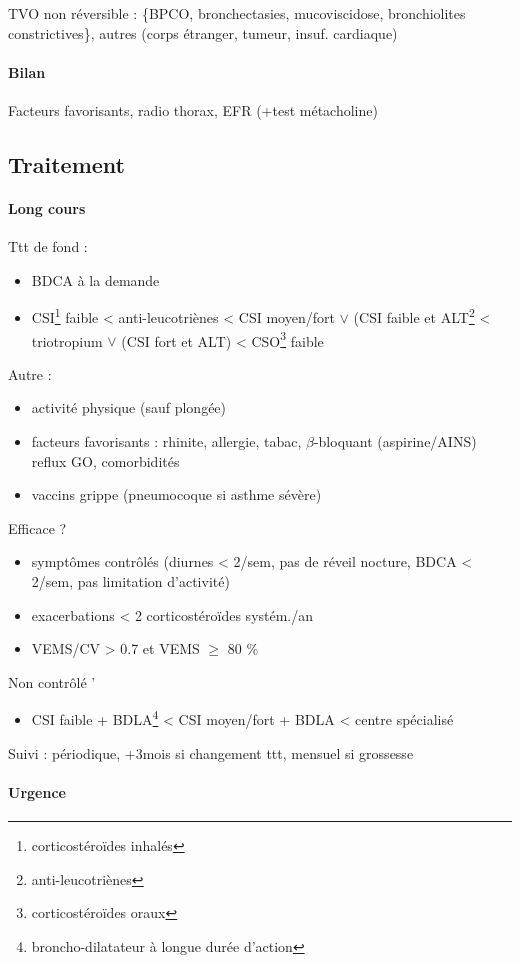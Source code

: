 \documentclass{article}
\begin{document}
TVO non réversible : \{BPCO, bronchectasies, mucoviscidose, bronchiolites
constrictives\}, autres (corps étranger, tumeur, insuf. cardiaque)
\paragraph{Bilan}
Facteurs favorisants, radio thorax, EFR (+test métacholine)

\subsection{Traitement}

\paragraph{Long cours}
Ttt de fond :
\begin{itemize}
\item BDCA à la demande
\item CSI\footnote{corticostéroïdes inhalés} faible < anti-leucotriènes < CSI moyen/fort
\(\vee\) (CSI faible et ALT\footnote{anti-leucotriènes} < triotropium \(\vee\) (CSI fort et
ALT) < CSO\footnote{corticostéroïdes oraux} faible
\end{itemize}
Autre : 
\begin{itemize}
\item activité physique (sauf plongée)
\item facteurs favorisants : rhinite, allergie, tabac, \(\beta\)-bloquant
(aspirine/AINS) reflux GO, comorbidités
\item vaccins grippe (pneumocoque si asthme sévère)
\end{itemize}
Efficace ?
\begin{itemize}
\item symptômes contrôlés (diurnes < 2/sem, pas de réveil nocture, BDCA < 2/sem, pas
limitation d'activité)
\item exacerbations < 2 corticostéroïdes systém./an
\item VEMS/CV > 0.7 et VEMS \(\ge\) 80 \%
\end{itemize}
Non contrôlé '
\begin{itemize}
\item CSI faible + BDLA\footnote{broncho-dilatateur à longue durée d'action} < CSI
moyen/fort + BDLA < centre spécialisé
\end{itemize}
Suivi : périodique, +3mois si changement ttt, mensuel si grossesse

\paragraph{Urgence}
\end{document}
